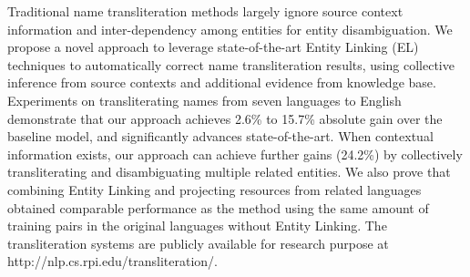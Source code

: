 Traditional name transliteration methods largely ignore source context information and inter-dependency among entities for entity disambiguation. We propose a novel approach to leverage state-of-the-art Entity Linking (EL) techniques to automatically correct name transliteration results, using collective inference from source contexts and additional evidence from knowledge base. Experiments on transliterating names from seven languages to English demonstrate that our approach achieves 2.6\% to 15.7\% absolute gain over the baseline model, and significantly advances state-of-the-art. When contextual information exists, our approach can achieve further gains (24.2\%) by collectively transliterating and disambiguating multiple related entities. We also prove that combining Entity Linking and projecting resources from related languages obtained comparable performance as the method using the same amount of training pairs in the original languages without Entity Linking. The transliteration systems are publicly available for research purpose at http://nlp.cs.rpi.edu/transliteration/.
